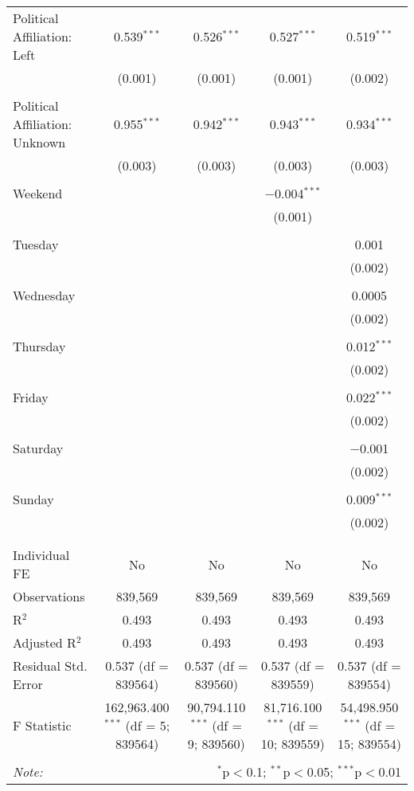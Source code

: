 \documentclass[
]{article}
\begin{document}
\begin{table}[!htbp]
{\begin{tabular}{@{\extracolsep{5pt}}lcccc}
 Political Affiliation: Left & 0.539$^{***}$ & 0.526$^{***}$ & 0.527$^{***}$ & 0.519$^{***}$ \\ 
  & (0.001) & (0.001) & (0.001) & (0.002) \\ 
  & & & & \\ 
 Political Affiliation: Unknown & 0.955$^{***}$ & 0.942$^{***}$ & 0.943$^{***}$ & 0.934$^{***}$ \\ 
  & (0.003) & (0.003) & (0.003) & (0.003) \\ 
  & & & & \\ 
 Weekend &  &  & $-$0.004$^{***}$ &  \\ 
  &  &  & (0.001) &  \\ 
  & & & & \\ 
 Tuesday &  &  &  & 0.001 \\ 
  &  &  &  & (0.002) \\ 
  & & & & \\ 
 Wednesday &  &  &  & 0.0005 \\ 
  &  &  &  & (0.002) \\ 
  & & & & \\ 
 Thursday &  &  &  & 0.012$^{***}$ \\ 
  &  &  &  & (0.002) \\ 
  & & & & \\ 
 Friday &  &  &  & 0.022$^{***}$ \\ 
  &  &  &  & (0.002) \\ 
  & & & & \\ 
 Saturday &  &  &  & $-$0.001 \\ 
  &  &  &  & (0.002) \\ 
  & & & & \\ 
 Sunday &  &  &  & 0.009$^{***}$ \\ 
  &  &  &  & (0.002) \\ 
  & & & & \\ 
\hline \\[-1.8ex] 
Individual FE & No & No & No & No \\ 
Observations & 839,569 & 839,569 & 839,569 & 839,569 \\ 
R$^{2}$ & 0.493 & 0.493 & 0.493 & 0.493 \\ 
Adjusted R$^{2}$ & 0.493 & 0.493 & 0.493 & 0.493 \\ 
Residual Std. Error & 0.537 (df = 839564) & 0.537 (df = 839560) & 0.537 (df = 839559) & 0.537 (df = 839554) \\ 
F Statistic & 162,963.400$^{***}$ (df = 5; 839564) & 90,794.110$^{***}$ (df = 9; 839560) & 81,716.100$^{***}$ (df = 10; 839559) & 54,498.950$^{***}$ (df = 15; 839554) \\ 
\hline 
\hline \\[-1.8ex] 
\textit{Note:}  & \multicolumn{4}{r}{$^{*}$p$<$0.1; $^{**}$p$<$0.05; $^{***}$p$<$0.01} \\ 
\end{tabular}
} 
\end{table} 
\newpage
\end{document}
